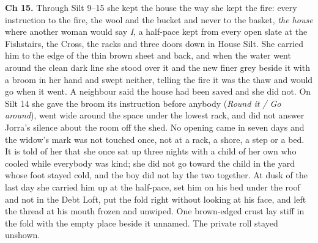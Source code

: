\documentclass{design/chronicle}
\begin{document}
{\textbf{Ch 15.} Through Silt 9–15 she kept the house the way she kept the fire: every instruction to the fire, the wool and the bucket and never to the basket, \emph{the house} where another woman would say \emph{I}, a half-pace kept from every open slate at the Fishstairs, the Cross, the racks and three doors down in House Silt. She carried him to the edge of the thin brown sheet and back, and when the water went around the clean dark line she stood over it and the new finer grey beside it with a broom in her hand and swept neither, telling the fire it was the thaw and would go when it went. A neighbour said the house had been saved and she did not. On Silt 14 she gave the broom its instruction before anybody (\emph{Round it / Go around}), went wide around the space under the lowest rack, and did not answer Jorra’s silence about the room off the shed. No opening came in seven days and the widow’s mark was not touched once, not at a rack, a shore, a step or a bed. It is told of her that she once sat up three nights with a child of her own who cooled while everybody was kind; she did not go toward the child in the yard whose foot stayed cold, and the boy did not lay the two together. At dusk of the last day she carried him up at the half-pace, set him on his bed under the roof and not in the Debt Loft, put the fold right without looking at his face, and left the thread at his mouth frozen and unwiped. One brown-edged crust lay stiff in the fold with the empty place beside it unnamed. The private roll stayed unshown.

}
\end{document}
